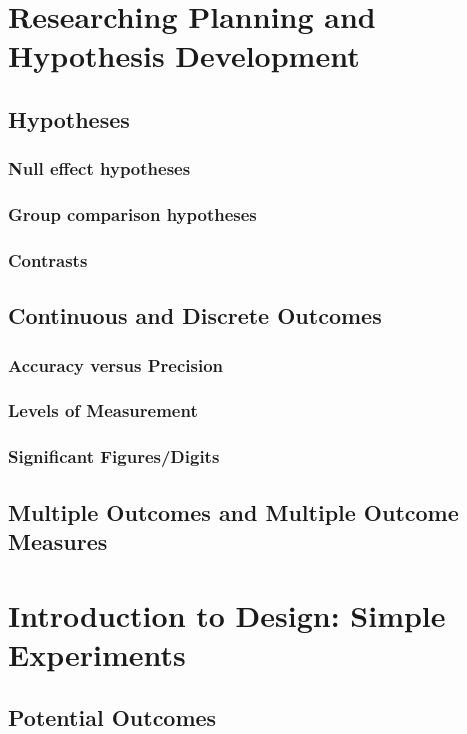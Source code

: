 \documentclass[12pt]{article}
\begin{document}
\section{Researching Planning and Hypothesis Development}
\subsection{Hypotheses}
\subsubsection{Null effect hypotheses}
\subsubsection{Group comparison hypotheses}
\subsubsection{Contrasts}

\subsection{Continuous and Discrete Outcomes}
\subsubsection{Accuracy versus Precision}

\subsubsection{Levels of Measurement}

\subsubsection{Significant Figures/Digits}

\subsection{Multiple Outcomes and Multiple Outcome Measures}




\section{Introduction to Design: Simple Experiments}
\subsection{Potential Outcomes}
\end{document}

